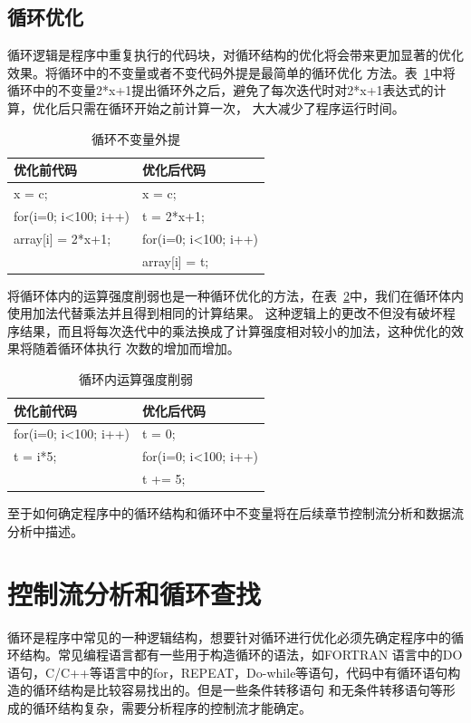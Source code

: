 \subsection{循环优化}
循环逻辑是程序中重复执行的代码块，对循环结构的优化将会带来更加显著的优化效果。将循环中的不变量或者不变代码外提是最简单的循环优化
方法。表~\ref{table4}中将循环中的不变量2*x+1提出循环外之后，避免了每次迭代时对2*x+1表达式的计算，优化后只需在循环开始之前计算一次，
大大减少了程序运行时间。
\begin{table}[h]
  \centering
  \caption{循环不变量外提}
  \begin{tabular}{p{7cm}<{\centering}p{7cm}<{\centering}}
    \hline
    优化前代码             & 优化后代码   \\
    \hline
    x = c;                    & x = c;    \\
    for(i=0; i<100; i++)      & t = 2*x+1; \\
      array[i] = 2*x+1;       & for(i=0; i<100; i++) \\
	                          &    array[i] = t;  \\
   \hline
  \end{tabular}
  \label{table4}
\end{table}
将循环体内的运算强度削弱也是一种循环优化的方法，在表~\ref{table5}中，我们在循环体内使用加法代替乘法并且得到相同的计算结果。
这种逻辑上的更改不但没有破坏程序结果，而且将每次迭代中的乘法换成了计算强度相对较小的加法，这种优化的效果将随着循环体执行
次数的增加而增加。
\begin{table}[h]
  \centering
  \caption{循环内运算强度削弱}
  \begin{tabular}{p{7cm}<{\centering}p{7cm}<{\centering}}
    \hline
    优化前代码             & 优化后代码   \\
    \hline
    for(i=0; i<100; i++)      & t = 0; \\
       t = i*5;                & for(i=0; i<100; i++)\\ 
                             &    t += 5;\\
  \hline
  \end{tabular}
  \label{table5}
\end{table}
至于如何确定程序中的循环结构和循环中不变量将在后续章节控制流分析和数据流分析中描述。

\section{控制流分析和循环查找}
循环是程序中常见的一种逻辑结构，想要针对循环进行优化必须先确定程序中的循环结构。常见编程语言都有一些用于构造循环的语法，如FORTRAN
语言中的DO语句，C/C++等语言中的for，REPEAT，Do-while等语句，代码中有循环语句构造的循环结构是比较容易找出的。但是一些条件转移语句
和无条件转移语句等形成的循环结构复杂，需要分析程序的控制流才能确定。
